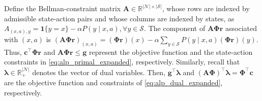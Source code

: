 \documentclass[sglanonrev]{informs4}
\providecommand{\bA}{\boldsymbol{A}}
\providecommand{\bPhi}{\boldsymbol{\Phi}}
\providecommand{\bc}{\boldsymbol{c}}
\providecommand{\bg}{\boldsymbol{g}}
\providecommand{\blambda}{\boldsymbol{\lambda}}
\providecommand{\br}{\boldsymbol{r}}
\begin{document}
Define the Bellman-constraint matrix $\bA\in\mathbb R^{|\mathcal N|\times|\mathcal S|}$, whose rows are indexed by admissible state-action pairs and whose columns are indexed by states,
as 
$ 
A_{(x,a),y} =
\mathbf 1\{y=x\}-\alpha P(y\mid x,a), \forall y\in\mathcal S
$. The component of $\bA\bPhi\br$ associated with $(x,a)$ is
$
(\bA\bPhi\br)_{(x,a)}
=
  (\bPhi\br)(x)
  -
  \alpha\sum_{y\in\mathcal S}
  P(y\mid x,a)(\bPhi\br)(y).
$
Thus, 
$\bc^\top\bPhi\br$  
and 
$\bA\bPhi\br\leq\bg$ 
represent the objective function and the state-action
constraints in \eqref{eq:alp_primal_expanded}, respectively. 
Similarly, recall that $\blambda\in\mathbb R_+^{|\mathcal N|}$ denotes the vector of dual variables. Then,
$\bg^\top\blambda$ 
and 
$(\bA\bPhi)^\top\blambda=\bPhi^\top\bc$ are the objective function and constraints of \eqref{eq:alp_dual_expanded}, respectively.

\end{document}
